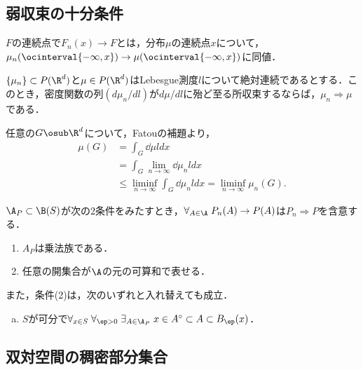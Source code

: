 \documentclass[uplatex,dvipdfmx]{jsreport}
\begin{document}
\subsection{弱収束の十分条件}

\begin{tcolorbox}[colframe=ForestGreen, colback=ForestGreen!10!white,breakable,colbacktitle=ForestGreen!40!white,coltitle=black,fonttitle=\bfseries\sffamily,
title=]
    $F$の連続点で$F_n(x)\to F$とは，分布$\mu$の連続点$x$について，$\mu_n(\ocinterval{-\infty,x})\to\mu(\ocinterval{-\infty,x})$に同値．
\end{tcolorbox}

\begin{corollary}[密度が収束するならば弱収束する]
    $\{\mu_n\}\subset P(\R^d)$と$\mu\in P(\R^d)$はLebesgue測度$l$について絶対連続であるとする．このとき，密度関数の列$(d\mu_n/dl)$が$d\mu/dl$に殆ど至る所収束するならば，$\mu_n\Rightarrow\mu$である．
\end{corollary}
\begin{Proof}
    任意の$G\osub\R^d$について，Fatouの補題より，
    \begin{align*}
        \mu(G)&=\int_G\dd{\mu}{l}dx\\
        &=\int_G\lim_{n\to\infty}\dd{\mu_n}{l}dx\\
        &\le\liminf_{n\to\infty}\int_G\dd{\mu_n}{l}dx=\liminf_{n\to\infty}\mu_n(G).
    \end{align*}
\end{Proof}

\begin{theorem}[一致の定理が成り立つ部分Borel集合族上での一致]\mbox{}
    $\A_P\subset\B(S)$が次の2条件をみたすとき，$\forall_{A\in\A}\;P_n(A)\to P(A)$は$P_n\Rightarrow P$を含意する．
    \begin{enumerate}
        \item $A_P$は乗法族である．
        \item 任意の開集合が$\A$の元の可算和で表せる．
    \end{enumerate}
    また，条件(2)は，次のいずれと入れ替えても成立．
    \begin{enumerate}[(a)]
        \item $S$が可分で$\forall_{x\in S}\;\forall_{\ep>0}\;\exists_{A\in\A_P}\;x\in A^\circ\subset A\subset B_\ep(x)$．
    \end{enumerate}
\end{theorem}

\subsection{双対空間の稠密部分集合}
\end{document}
